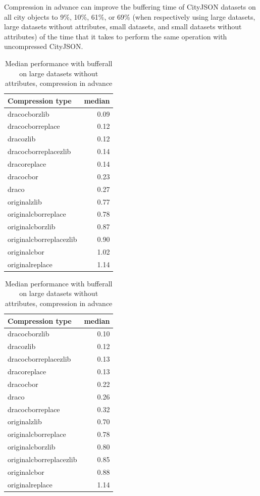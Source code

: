Compression in advance can improve the buffering time of CityJSON datasets on all city objects to 9\%, 10\%, 61\%, or 69\% (when respectively using large datasets, large datasets without attributes, small datasets, and small datasets without attributes) of the time that it takes to perform the same operation with uncompressed CityJSON.



  \begin{table}[!h]
    \begin{minipage}{.5\linewidth}
      \caption{
Median performance with bufferall on large datasets, compression in advance}
\centering

\begin{tabular}{|l|r|}
\hline
Compression type & median\\
\hline
dracocborzlib & 0.09\\
\hline
dracocborreplace & 0.12\\
\hline
dracozlib & 0.12\\
\hline
dracocborreplacezlib & 0.14\\
\hline
dracoreplace & 0.14\\
\hline
dracocbor & 0.23\\
\hline
draco & 0.27\\
\hline
originalzlib & 0.77\\
\hline
originalcborreplace & 0.78\\
\hline
originalcborzlib & 0.87\\
\hline
originalcborreplacezlib & 0.90\\
\hline
originalcbor & 1.02\\
\hline
originalreplace & 1.14\\
\hline
\end{tabular}
\end{minipage}%
    \begin{minipage}{.5\linewidth}
      \centering
        \caption{
Median performance with bufferall on large datasets without attributes, compression in advance}

\begin{tabular}{|l|r|}
\hline
Compression type & median\\
\hline
dracocborzlib & 0.10\\
\hline
dracozlib & 0.12\\
\hline
dracocborreplacezlib & 0.13\\
\hline
dracoreplace & 0.13\\
\hline
dracocbor & 0.22\\
\hline
draco & 0.26\\
\hline
dracocborreplace & 0.32\\
\hline
originalzlib & 0.70\\
\hline
originalcborreplace & 0.78\\
\hline
originalcborzlib & 0.80\\
\hline
originalcborreplacezlib & 0.85\\
\hline
originalcbor & 0.88\\
\hline
originalreplace & 1.14\\
\hline
\end{tabular}
\end{minipage} 
\end{table}
